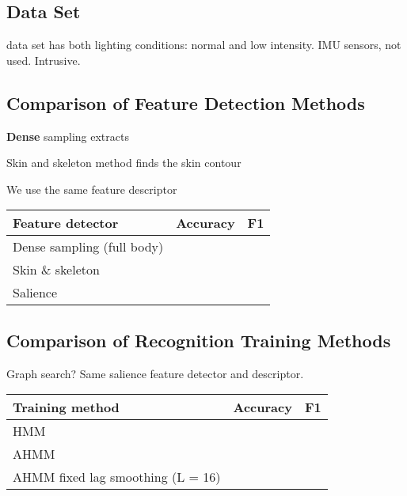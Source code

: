 \documentclass{sigchi}
\newcommand\tabhead[1]{\small\textbf{#1}}
\begin{document}
\subsection{Data Set}
data set has both lighting conditions: normal and low intensity. IMU sensors, not used. Intrusive.

\subsection{Comparison of Feature Detection Methods}

\textbf{Dense} sampling extracts

Skin and skeleton method finds the skin contour 
  
We use the same feature descriptor 
\begin{table}
\centering
\begin{tabular}{|l|c|c|}
\hline
\tabhead{Feature detector} & {\tabhead{Accuracy}} & {\tabhead{F1}}\\
\hline
Dense sampling (full body) & & \\
\hline
Skin \& skeleton & & \\
\hline
Salience & & \\
\hline
\end{tabular}
\end{table}

\subsection{Comparison of Recognition Training Methods}
Graph search?
Same salience feature detector and descriptor.
\begin{table}
\centering
\begin{tabular}{|l|c|c|}
\hline
\tabhead{Training method} & {\tabhead{Accuracy}} & {\tabhead{F1}}\\
\hline
HMM & & \\
\hline
AHMM & & \\
\hline
AHMM fixed lag smoothing (L = 16) & & \\ 
\hline
\end{tabular}
\end{table}
\end{document}
